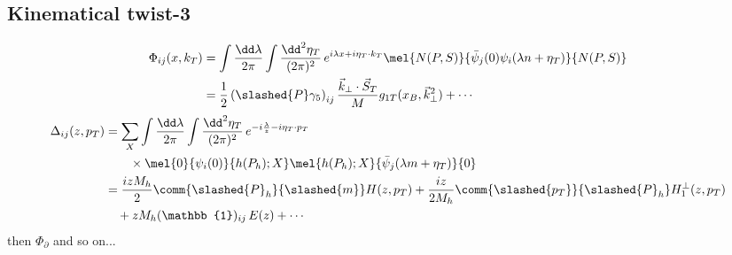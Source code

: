 \subsection{Kinematical twist-3}
\begin{equation}
    \begin{aligned}
        \Phi_{ij}(x,k_T)&= \int\frac{\dd \lambda}{2\pi}\int \frac{\dd^2 \eta_T}{(2\pi)^2} \,e^{i\lambda x+i \eta_T\cdot k_T}\mel{N(P,S)}{\bar \psi_j(0) \psi_i(\lambda n+\eta_T)}{N(P,S)}\\
        &= \frac{1}{2}\left(\slashed{P }\gamma_5\right)_{ij} \frac{\vec k_\perp\cdot \vec S_T}{M}g_{1T}(x_B,\vec k_\perp^2)+\cdots
    \end{aligned}
\end{equation}
\begin{equation}
    \begin{aligned}
        \Delta_{ij}(z,p_T)&= \sum_X\int\frac{\dd \lambda}{2\pi}\int\frac{\dd^2\eta_T}{(2\pi)^2} \,e^{-i\frac{\lambda}{z}-i\eta_T\cdot p_T}\\
        &\qquad\times\mel{0}{\psi_i(0)}{h(P_h);X}\mel{h(P_h);X}{\bar \psi_j(\lambda m+\eta_T)}{0}\\
        &= \frac{i z M_h}{2}\comm{\slashed{P}_h}{\slashed{m}}H(z,p_T)+\frac{iz}{2M_h}\comm{\slashed{p_T}}{\slashed{P}_h}H_1^{\perp}(z,p_T)\\
        &\quad +zM_h(\mathbb{1})_{ij}\,E(z)+\cdots
        \end{aligned}
\end{equation}
then $\Phi_\partial$ and so on...

